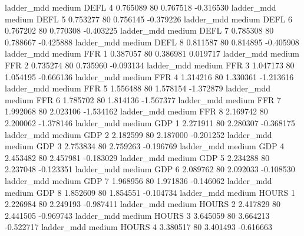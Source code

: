          ladder_mdd     medium     DEFL                 4  0.765089 80       0.767518          -0.316530
         ladder_mdd     medium     DEFL                 5  0.753277 80       0.756145          -0.379226
         ladder_mdd     medium     DEFL                 6  0.767202 80       0.770308          -0.403225
         ladder_mdd     medium     DEFL                 7  0.785308 80       0.788667          -0.425888
         ladder_mdd     medium     DEFL                 8  0.811587 80       0.814895          -0.405908
         ladder_mdd     medium      FFR                 1  0.387057 80       0.386981           0.019717
         ladder_mdd     medium      FFR                 2  0.735274 80       0.735960          -0.093134
         ladder_mdd     medium      FFR                 3  1.047173 80       1.054195          -0.666136
         ladder_mdd     medium      FFR                 4  1.314216 80       1.330361          -1.213616
         ladder_mdd     medium      FFR                 5  1.556488 80       1.578154          -1.372879
         ladder_mdd     medium      FFR                 6  1.785702 80       1.814136          -1.567377
         ladder_mdd     medium      FFR                 7  1.992068 80       2.023106          -1.534162
         ladder_mdd     medium      FFR                 8  2.169742 80       2.200062          -1.378146
         ladder_mdd     medium      GDP                 1  2.271911 80       2.280307          -0.368175
         ladder_mdd     medium      GDP                 2  2.182599 80       2.187000          -0.201252
         ladder_mdd     medium      GDP                 3  2.753834 80       2.759263          -0.196769
         ladder_mdd     medium      GDP                 4  2.453482 80       2.457981          -0.183029
         ladder_mdd     medium      GDP                 5  2.234288 80       2.237048          -0.123351
         ladder_mdd     medium      GDP                 6  2.089762 80       2.092033          -0.108530
         ladder_mdd     medium      GDP                 7  1.968956 80       1.971836          -0.146062
         ladder_mdd     medium      GDP                 8  1.852609 80       1.854551          -0.104734
         ladder_mdd     medium    HOURS                 1  2.226984 80       2.249193          -0.987411
         ladder_mdd     medium    HOURS                 2  2.417829 80       2.441505          -0.969743
         ladder_mdd     medium    HOURS                 3  3.645059 80       3.664213          -0.522717
         ladder_mdd     medium    HOURS                 4  3.380517 80       3.401493          -0.616663
